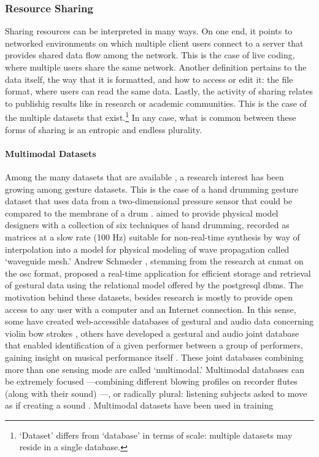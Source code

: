 \subsubsection{Resource Sharing}
{
	Sharing resources can be interpreted in many ways. On one end, it points to networked environments on which multiple client users connect to a server that provides shared data flow among the network. This is the case of live coding, where multiple users share the same network. Another definition pertains to the data itself, the way that it is formatted, and how to access or edit it: the file format, where users can read the same data. Lastly, the activity of sharing relates to publishig results like in research or academic communities. This is the case of the multiple datasets that exist.\footnote{`Dataset' differs from `database' in terms of scale: multiple datasets may reside in a single database.} In any case, what is common between these forms of sharing is an entropic and endless plurality.

	\paragraph{Multimodal Datasets}
	Among the many datasets that are available , a research interest has been growing among gesture datasets. This is the case of a hand drumming gesture dataset that uses data from a two-dimensional pressure sensor that could be compared to the membrane of a drum \parencite{DBLP:conf/icmc/JonesLS07}. \citeauthor{DBLP:conf/icmc/JonesLS07} aimed to provide physical model designers with a collection of six techniques of hand drumming, recorded as matrices at a slow rate (100 Hz) suitable for non-real-time synthesis by way of interpolation into a model for physical modeling of wave propagation called `waveguide mesh.' Andrew Schmeder \parencite{icmc/bbp2372.2009.005}, stemming from the research at \gls{cnmat} on the \gls{osc} format, proposed a real-time application for efficient storage and retrieval of gestural data using the relational model offered by the \gls{postgresql} \gls{dbms}. The motivation behind these datasets, besides research is mostly to provide open access to any user with a computer and an Internet connection. In this sense, some have created web-accessible databases of gestural and audio data concerning violin bow strokes \parencite{Young2007}, others have developed a gestural and audio joint database that enabled identification of a given performer between a group of performers, gaining insight on musical performance itself \parencite{Hochenbaum2010}. These joint databases combining more than one sensing mode are called `multimodal.' Multimodal databases can be extremely focused ---combining different blowing profiles on recorder flutes (along with their sound) \parencite{Garcia2011}---, or radically plural: listening subjects asked to move as if creating a sound \parencite{fvisi:2017}. Multimodal datasets have been used in training \parencite{DBLP:conf/icmc/SchonerCDG98}

}
